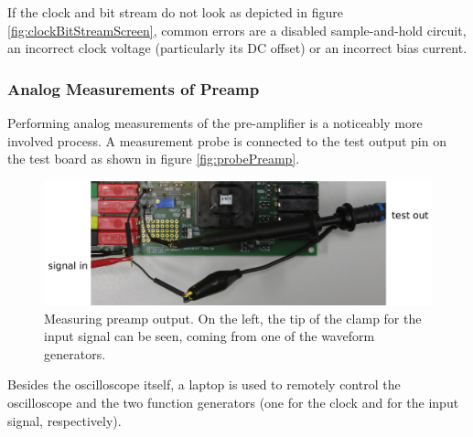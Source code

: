 
If  the   clock  and   bit  stream   do  not  look   as  depicted   in  figure
\ref{fig:clockBitStreamScreen}, common  errors are a  disabled sample-and-hold
circuit,  an  incorrect clock  voltage  (particularly  its  DC offset)  or  an
incorrect bias current.


\subsubsection{Analog Measurements of Preamp}
\label{subsubsec:analogMeasurements}

Performing  analog measurements  of  the pre-amplifier  is  a noticeably  more
involved process. A measurement  probe is connected to the test  output pin on
the test board as shown in figure \ref{fig:probePreamp}.

\begin{figure}
    \centering
    \includegraphics[width=\textwidth]{images/expSetup/testBoardOsciTestOutProbe.jpeg}
    \caption{%
        Measuring preamp  output. On the left,  the tip  of the clamp  for the
        input signal can be seen, coming from one of the waveform generators.%
    }
    \label{fig:testOutProbe}
\end{figure}


Besides the  oscilloscope itself,  a laptop  is used  to remotely  control the
oscilloscope and  the two function generators  (one for the clock  and for the
input signal, respectively).

